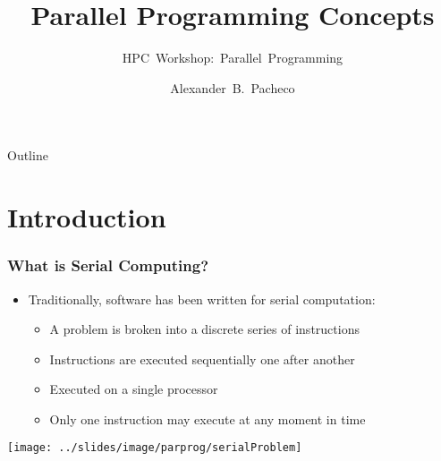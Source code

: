 \documentclass[10pt,t]{beamer}
\title{Parallel Programming Concepts}
\subtitle{HPC~Workshop:~Parallel~Programming}
\author{\large{Alexander~B.~Pacheco}}
\institute[Lehigh University Research Computing]{\href{http://researchcomputing.lehigh.edu}{Research~Computing}}
\date{}%
\begin{document}
\begin{frame}
  \titlepage
\end{frame}

\begin{frame}[c]{Outline}
  \tableofcontents%
\end{frame}

\section{Introduction}
\begin{frame}
  \frametitle{What is Serial Computing?}
  \begin{itemize}
  \item Traditionally, software has been written for serial computation:
    \begin{itemize}
    \item A problem is broken into a discrete series of instructions
    \item Instructions are executed sequentially one after another
    \item Executed on a single processor
    \item Only one instruction may execute at any moment in time
    \end{itemize}
  \end{itemize}
  \texttt{[image: ../slides/image/parprog/serialProblem]}
\end{frame}
\end{document}
